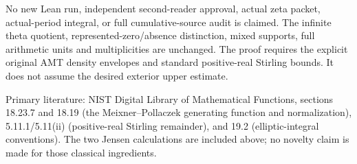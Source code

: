 \documentclass[11pt,a4paper]{article}
\begin{document}
No new Lean run, independent second-reader approval, actual zeta packet, actual-period integral, or full cumulative-source audit is claimed. The infinite theta quotient, represented-zero/absence distinction, mixed supports, full arithmetic units and multiplicities are unchanged. The proof requires the explicit original AMT density envelopes and standard positive-real Stirling bounds. It does not assume the desired exterior upper estimate.

Primary literature: NIST Digital Library of Mathematical Functions, sections 18.23.7 and 18.19 (the Meixner--Pollaczek generating function and normalization), 5.11.1/5.11(ii) (positive-real Stirling remainder), and 19.2 (elliptic-integral conventions). The two Jensen calculations are included above; no novelty claim is made for those classical ingredients.

\endgroup

\endgroup

\clearpage
\label{MTBUILD:NEW_HUMAN_REFERENCES:start}
\end{document}
